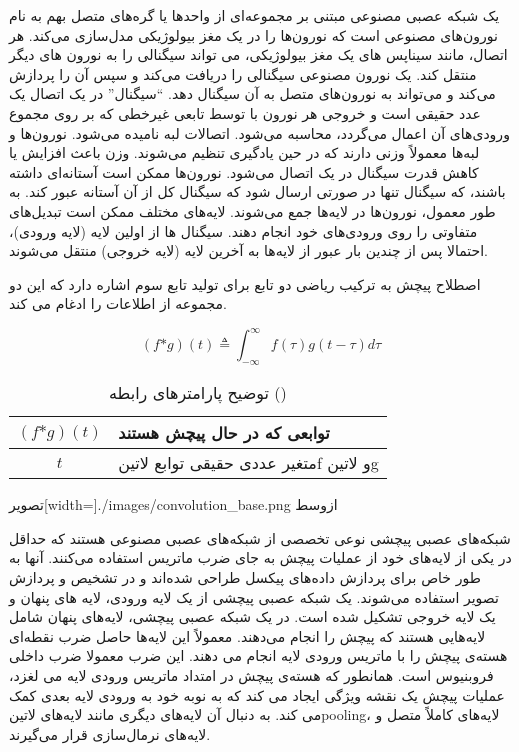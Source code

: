 
یک شبکه عصبی مصنوعی مبتنی بر مجموعه‌ای از واحدها یا گره‌های متصل بهم به نام نورون‌های مصنوعی است که نورون‌ها را در یک مغز بیولوژیکی مدل‌سازی می‌کند.
هر اتصال، مانند سیناپس های یک مغز بیولوژیکی، می تواند سیگنالی را به نورون های دیگر منتقل کند.
یک نورون مصنوعی سیگنالی را دریافت می‌کند و سپس آن را پردازش می‌کند و می‌تواند به نورون‌های متصل به آن سیگنال دهد.
``سیگنال'' در یک اتصال یک عدد حقیقی است و خروجی هر نورون با توسط تابعی غیرخطی که بر روی مجموع ورودی‌های آن اعمال می‌گردد، محاسبه می‌شود. اتصالات لبه نامیده می‌شود.
نورون‌ها و لبه‌ها معمولاً وزنی دارند که در حین یادگیری تنظیم می‌شوند. وزن باعث افزایش یا کاهش قدرت سیگنال در یک اتصال می‌شود. نورون‌ها ممکن است آستانه‌ای داشته باشند، که سیگنال تنها در صورتی ارسال شود که سیگنال کل از آن آستانه عبور کند.
به طور معمول، نورون‌ها در لایه‌ها جمع می‌شوند. لایه‌های مختلف ممکن است تبدیل‌های متفاوتی را روی ورودی‌های خود انجام دهند.
سیگنال ها از اولین لایه (لایه ورودی)، احتمالا پس از چندین بار عبور از لایه‌ها به آخرین لایه (لایه خروجی) منتقل می‌شوند.

اصطلاح پیچش به ترکیب ریاضی دو تابع برای تولید تابع سوم اشاره دارد که این دو مجموعه از اطلاعات را ادغام می کند.

\begin{equation}
  \label{eq:conv}
(f \text{*} g)(t) \triangleq \int_{-\infty}^\infty f(\tau)g(t - \tau)d\tau
\end{equation}


\begin{table}[h]
  \centering
  \caption{توضیح پارامترهای رابطه ()}
  \begin{tabular}{|c|p{}|}
    \hline
    $(f \text{*} g)(t)$ & توابعی که در حال پیچش هستند \\
    \hline
    $t$ & متغیر عددی حقیقی توابع ‌لاتین{f}  و ‌لاتین{g} \\
    \hline
  \end{tabular}
  \label{tbl:distance}
\end{table}

  ‌تصویر[width=\textwidth]{./images/convolution_base.png}
  ‌ازوسط

شبکه‌های عصبی پیچشی نوعی تخصصی از شبکه‌های عصبی مصنوعی هستند که حداقل در یکی از لایه‌های خود از عملیات پیچش به جای ضرب ماتریس استفاده می‌کنند.
آنها به طور خاص برای پردازش داده‌های پیکسل طراحی شده‌اند و در تشخیص و پردازش تصویر استفاده می‌شوند.
یک شبکه عصبی پیچشی از یک لایه ورودی، لایه های پنهان و یک لایه خروجی تشکیل شده است. در یک شبکه عصبی پیچشی، لایه‌های پنهان شامل لایه‌هایی هستند که پیچش را انجام می‌دهند. معمولاً این لایه‌ها حاصل ضرب نقطه‌ای هسته‌ی پیچش را با ماتریس ورودی لایه انجام می دهند. این ضرب معمولا ضرب داخلی فروبنیوس است. همانطور که هسته‌ی پیچش در امتداد ماتریس ورودی لایه می لغزد، عملیات پیچش یک نقشه ویژگی ایجاد می کند که به نوبه خود به ورودی لایه بعدی کمک می کند. به دنبال آن لایه‌های دیگری مانند لایه‌های ‌لاتین{pooling}، لایه‌های کاملاً متصل و لایه‌های نرمال‌سازی قرار می‌گیرند.

